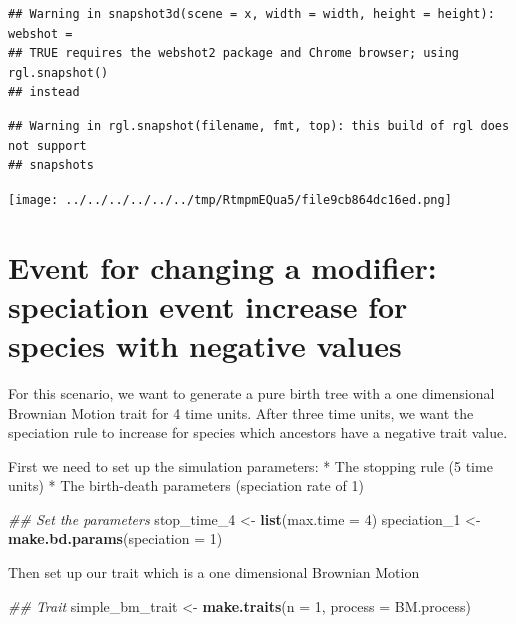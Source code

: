 \documentclass[
]{book}
\newenvironment{Shaded}{\begin{snugshade}}{\end{snugshade}}
\newcommand{\CommentTok}[1]{\textcolor[rgb]{0.56,0.35,0.01}{\textit{#1}}}
\newcommand{\DataTypeTok}[1]{\textcolor[rgb]{0.13,0.29,0.53}{#1}}
\newcommand{\DecValTok}[1]{\textcolor[rgb]{0.00,0.00,0.81}{#1}}
\newcommand{\KeywordTok}[1]{\textcolor[rgb]{0.13,0.29,0.53}{\textbf{#1}}}
\newcommand{\NormalTok}[1]{#1}
\newcommand{\StringTok}[1]{\textcolor[rgb]{0.31,0.60,0.02}{#1}}
\begin{document}
\begin{verbatim}
## Warning in snapshot3d(scene = x, width = width, height = height): webshot =
## TRUE requires the webshot2 package and Chrome browser; using rgl.snapshot()
## instead
\end{verbatim}

\begin{verbatim}
## Warning in rgl.snapshot(filename, fmt, top): this build of rgl does not support
## snapshots
\end{verbatim}

\texttt{[image: ../../../../../../tmp/RtmpmEQua5/file9cb864dc16ed.png]}

\hypertarget{EG_change_modif}{%
\section{Event for changing a modifier: speciation event increase for species with negative values}\label{EG_change_modif}}

For this scenario, we want to generate a pure birth tree with a one dimensional Brownian Motion trait for 4 time units.
After three time units, we want the speciation rule to increase for species which ancestors have a negative trait value.

First we need to set up the simulation parameters:
* The stopping rule (5 time units)
* The birth-death parameters (speciation rate of 1)

\begin{Shaded}
\begin{Highlighting}[]
\CommentTok{\#\# Set the parameters}
\NormalTok{stop\_time\_}\DecValTok{4}\NormalTok{ \textless{}{-}}\StringTok{ }\KeywordTok{list}\NormalTok{(}\DataTypeTok{max.time =} \DecValTok{4}\NormalTok{)}
\NormalTok{speciation\_}\DecValTok{1}\NormalTok{ \textless{}{-}}\StringTok{ }\KeywordTok{make.bd.params}\NormalTok{(}\DataTypeTok{speciation =} \DecValTok{1}\NormalTok{)}
\end{Highlighting}
\end{Shaded}

Then set up our trait which is a one dimensional Brownian Motion

\begin{Shaded}
\begin{Highlighting}[]
\CommentTok{\#\# Trait}
\NormalTok{simple\_bm\_trait \textless{}{-}}\StringTok{ }\KeywordTok{make.traits}\NormalTok{(}\DataTypeTok{n =} \DecValTok{1}\NormalTok{, }\DataTypeTok{process =}\NormalTok{ BM.process)}
\end{Highlighting}
\end{Shaded}
\end{document}
